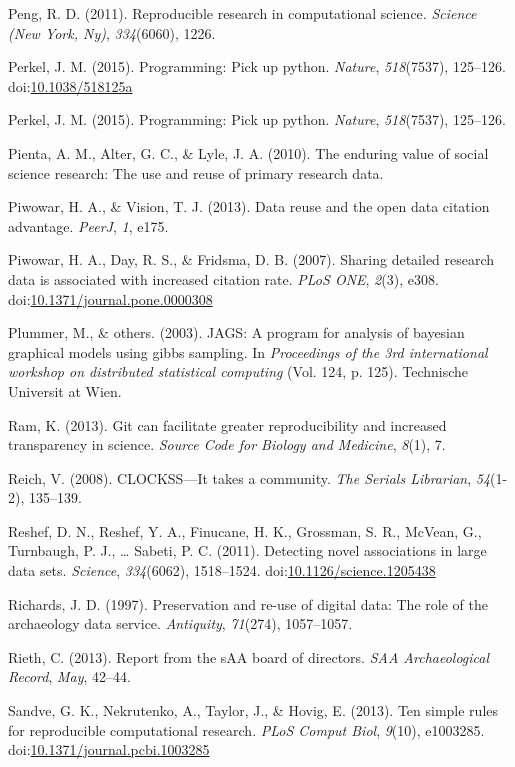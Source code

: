 \documentclass[american,man]{apa6}
\begin{document}
Peng, R. D. (2011). Reproducible research in computational science.
\emph{Science (New York, Ny)}, \emph{334}(6060), 1226.

Perkel, J. M. (2015). Programming: Pick up python. \emph{Nature},
\emph{518}(7537), 125--126.
doi:\href{http://dx.doi.org/10.1038/518125a}{10.1038/518125a}

Perkel, J. M. (2015). Programming: Pick up python. \emph{Nature},
\emph{518}(7537), 125--126.

Pienta, A. M., Alter, G. C., \& Lyle, J. A. (2010). The enduring value
of social science research: The use and reuse of primary research data.

Piwowar, H. A., \& Vision, T. J. (2013). Data reuse and the open data
citation advantage. \emph{PeerJ}, \emph{1}, e175.

Piwowar, H. A., Day, R. S., \& Fridsma, D. B. (2007). Sharing detailed
research data is associated with increased citation rate. \emph{PLoS
ONE}, \emph{2}(3), e308.
doi:\href{http://dx.doi.org/10.1371/journal.pone.0000308}{10.1371/journal.pone.0000308}

Plummer, M., \& others. (2003). JAGS: A program for analysis of bayesian
graphical models using gibbs sampling. In \emph{Proceedings of the 3rd
international workshop on distributed statistical computing} (Vol. 124,
p. 125). Technische Universit at Wien.

Ram, K. (2013). Git can facilitate greater reproducibility and increased
transparency in science. \emph{Source Code for Biology and Medicine},
\emph{8}(1), 7.

Reich, V. (2008). CLOCKSS---It takes a community. \emph{The Serials
Librarian}, \emph{54}(1-2), 135--139.

Reshef, D. N., Reshef, Y. A., Finucane, H. K., Grossman, S. R., McVean,
G., Turnbaugh, P. J., \ldots{} Sabeti, P. C. (2011). Detecting novel
associations in large data sets. \emph{Science}, \emph{334}(6062),
1518--1524.
doi:\href{http://dx.doi.org/10.1126/science.1205438}{10.1126/science.1205438}

Richards, J. D. (1997). Preservation and re-use of digital data: The
role of the archaeology data service. \emph{Antiquity}, \emph{71}(274),
1057--1057.

Rieth, C. (2013). Report from the sAA board of directors. \emph{SAA
Archaeological Record}, \emph{May}, 42--44.

Sandve, G. K., Nekrutenko, A., Taylor, J., \& Hovig, E. (2013). Ten
simple rules for reproducible computational research. \emph{PLoS Comput
Biol}, \emph{9}(10), e1003285.
doi:\href{http://dx.doi.org/10.1371/journal.pcbi.1003285}{10.1371/journal.pcbi.1003285}
\end{document}
